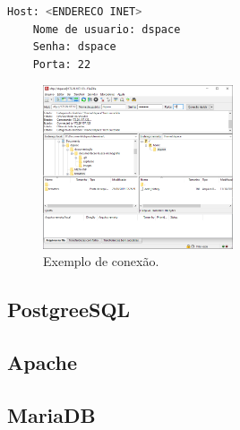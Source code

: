 \begin{lstlisting}[language=bash, label=lst2, caption=Campos do Filezilla para serem alterados]
    Host: <ENDERECO INET>
    Nome de usuario: dspace
    Senha: dspace
    Porta: 22
\end{lstlisting}

\begin{figure}[h]
    \centering
    \includegraphics[width=0.5\textwidth]{images/filezilla1.png}
    \caption{Exemplo de conexão.}
    \label{fig1}
\end{figure}

\subsection{PostgreeSQL}\label{postgree}

 \blindtext

 \blindtext

 \blindtext

\subsection{Apache}\label{apache}

 \blindtext

 \blindtext

 \blindtext

\subsection{MariaDB}\label{mariadb}

 \blindtext

 \blindtext

 \blindtext


